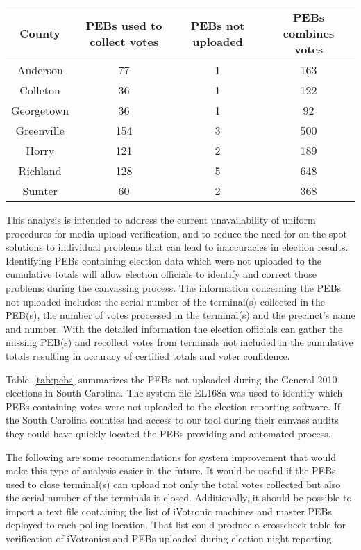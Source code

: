 \begin{table*}
    \begin{center}
    \begin{tabular}{| c | c | c | c |}
    \hline                   
    County &PEBs used to collect votes &PEBs not uploaded &PEBs combines votes\\
    \hline
    Anderson &77 &1 &163\\
    \hline
    Colleton &36 &1 &122\\
    \hline
    Georgetown &36 &1 &92\\
    \hline
    Greenville &154 &3 &500\\
    \hline
    Horry &121 &2 &189\\
    \hline
    Richland &128 &5 &648\\
    \hline
    Sumter &60 &2 &368\\
    \hline
    \end{tabular}
    \end{center}
    \caption{PEBs not uploaded}
    \label{tab:pebs}
\end{table*}
This analysis is intended to address the current unavailability of uniform procedures for media upload verification, and to reduce the need for on-the-spot solutions to individual problems that can lead to inaccuracies in election results. Identifying PEBs containing election data which were not uploaded to the cumulative totals will allow election officials to identify and correct those problems during the canvassing process. The information concerning the PEBs not uploaded includes: the serial number of the terminal(s) collected in the PEB(s), the number of votes processed in the terminal(s) and the precinct's name and number. With the detailed information the election officials can gather the missing PEB(s) and recollect votes from terminals not included in the cumulative totals resulting in accuracy of certified totals and voter confidence.

Table~\ref{tab:pebs} summarizes the PEBs not uploaded during the General 2010 elections in South Carolina. The system file EL168a was used to identify which PEBs containing votes were not uploaded to the election reporting software. If the South Carolina counties had access to our tool during their canvass audits they could have quickly located the PEBs providing and automated process.

The following are some recommendations for system improvement that would make this type of analysis easier in the future.  It would be useful if the PEBs used to close terminal(s) can upload not only the total votes collected but also the serial number of the terminals it closed. Additionally, it should be possible to import a text file containing the list of iVotronic machines and master PEBs deployed to each polling location.  That list could produce a crosscheck table for verification of iVotronics and PEBs uploaded during election night reporting.

